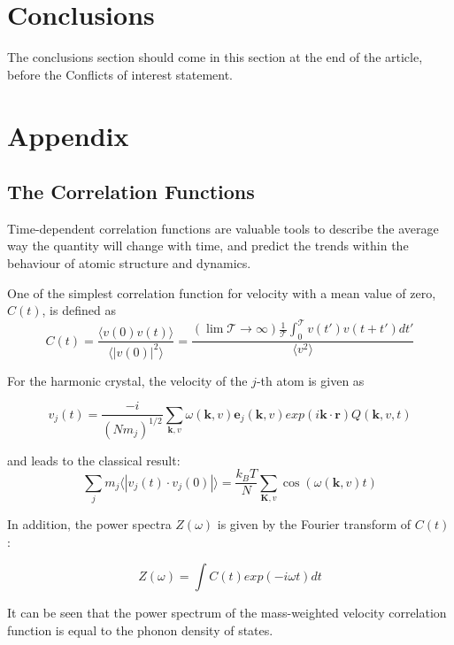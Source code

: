 \documentclass[twoside,twocolumn,9pt]{article}
\begin{document}
\section{Conclusions}
The conclusions section should come in this section at the end of the article, before the Conflicts of interest statement.

\section{Appendix}

\subsection{The Correlation Functions}

Time-dependent correlation functions are valuable tools to describe the average way the quantity will change with time,
and predict the trends within the behaviour of atomic structure and dynamics.


One of the simplest correlation function for velocity with a mean value of zero, $C(t)$, is defined as
 \begin{equation}
C(t)=\frac{\langle v(0)v(t)\rangle}{\langle | v(0)|^2 \rangle}
=\frac{(\lim \mathcal{T}\rightarrow \infty) \frac{1}{\mathcal{T}} \int^{\mathcal{T}}_{0} v(t')v(t+t')dt' }{\langle v^2 \rangle}
\end{equation}

For  the harmonic crystal, the velocity of the $j$-th atom is given as

\begin{equation}
v_j(t)=\frac{-i}{(Nm_j)^{1/2}}\sum_{\textbf{k},v}\omega(\textbf{k},v)\textbf{e}_j(\textbf{k},v)exp(i\textbf{k}\cdot \textbf{r})Q(\textbf{k},v,t)
\end{equation}

and leads to the classical result:
\begin{equation}
\sum_j  m_j \langle |v_j(t)\cdot v_j(0) |\rangle = \frac{k_B T}{N}\sum_{\textbf{K},v}\cos (\omega(\textbf{k}, v)t)
\end{equation}

In addition, the power spectra $Z(\omega)$ is given by the Fourier transform of $C(t)$:

\begin{equation}
Z(\omega)=\int C(t)exp(-i\omega t)dt
\end{equation}

It can be seen that the power spectrum of the mass-weighted velocity correlation function is equal to the phonon density of states.
\end{document}
